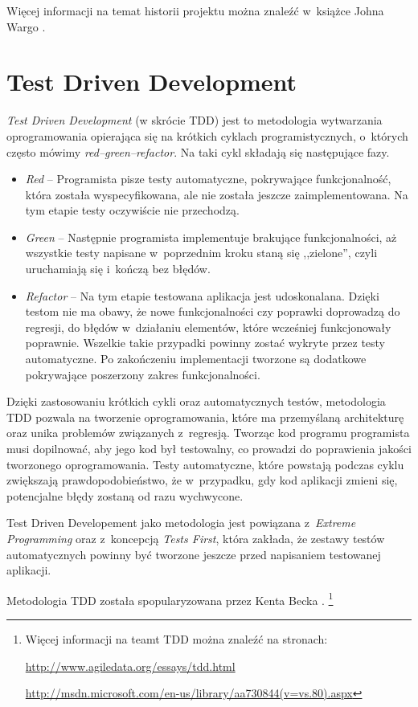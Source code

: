 \documentclass{xmgr}
\begin{document}
Więcej informacji na temat historii projektu można znaleźć w~książce Johna Wargo \cite{Wargo}. 

\section{Test Driven Development}

\textit{Test Driven Development} (w skrócie TDD) jest to metodologia wytwarzania oprogramowania opierająca się na krótkich cyklach programistycznych, o~których często mówimy \textit{red--green--refactor}. Na taki cykl składają się następujące fazy.
\begin{itemize}
  \item \textit{Red} -- Programista pisze testy automatyczne, pokrywające funkcjonalność, która została wyspecyfikowana, ale nie została jeszcze zaimplementowana. Na tym etapie testy oczywiście nie przechodzą.
  \item \textit{Green} -- Następnie programista implementuje brakujące funkcjonalności, aż wszystkie testy napisane w~poprzednim kroku staną się ,,zielone'', czyli uruchamiają się i~kończą bez błędów.
  \item \textit{Refactor} -- Na tym etapie testowana aplikacja jest udoskonalana. Dzięki testom nie ma obawy, że nowe funkcjonalności czy poprawki doprowadzą do regresji, do błędów w~działaniu elementów, które wcześniej funkcjonowały poprawnie. Wszelkie takie przypadki powinny zostać wykryte przez testy automatyczne. Po zakończeniu implementacji tworzone są dodatkowe pokrywające poszerzony zakres funkcjonalności.
\end{itemize}

Dzięki zastosowaniu krótkich cykli oraz automatycznych testów, metodologia TDD pozwala na tworzenie oprogramowania, które ma przemyślaną architekturę oraz unika problemów związanych z~regresją. Tworząc kod  programu programista musi dopilnować, aby jego kod był testowalny, co prowadzi do poprawienia jakości tworzonego oprogramowania. Testy automatyczne, które powstają podczas cyklu zwiększają prawdopodobieństwo, że w~przypadku, gdy kod aplikacji zmieni się, potencjalne błędy zostaną od razu wychwycone. 

Test Driven Developement jako metodologia jest powiązana z~\textit{Extreme Programming} oraz z~koncepcją \textit{Tests First}, która zakłada, że zestawy testów automatycznych powinny być tworzone jeszcze przed napisaniem testowanej aplikacji.

Metodologia TDD została spopularyzowana przez Kenta Becka \cite{Beck}.
\footnote{
Więcej informacji na teamt TDD można znaleźć na stronach:

\url{http://www.agiledata.org/essays/tdd.html}

\url{http://msdn.microsoft.com/en-us/library/aa730844(v=vs.80).aspx}
}
\end{document}
